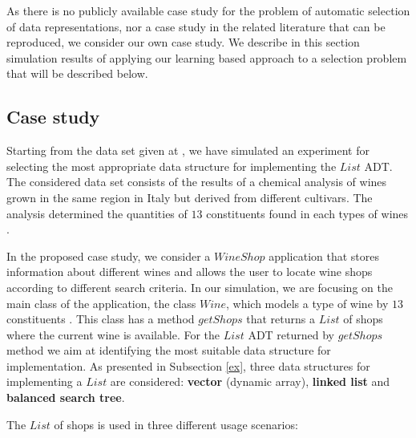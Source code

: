 As there is no publicly available case study for the problem of automatic selection of data representations, nor a case study in the related literature that can be reproduced, we consider our own case study. We describe in this section simulation results of applying
our learning based approach to a selection problem that will be described below.


\subsection{Case study}\label{cs}

Starting from the data set given at \cite{forina}, we have simulated an experiment for selecting the most appropriate data structure for implementing the $List$ ADT. The considered data set consists of the results of a chemical analysis of wines grown in the same region in Italy but derived from  different cultivars. The analysis determined the quantities of $13$ constituents found in each types of wines \cite{website:wine}.

In the proposed case study, we consider a $WineShop$ application that stores information about different wines and allows the user to locate wine shops according to different search criteria. In our simulation, we are focusing on the main class of the application, the class $Wine$, which models a type of wine by $13$ constituents \cite{website:wine}. This class has a method $getShops$ that returns a $List$ of shops where the current wine is available. For the $List$ ADT returned by $getShops$ method we aim at identifying the most suitable data structure for implementation.  As presented in Subsection \ref{ex}, three data structures for implementing a $List$ are considered: \textbf{vector} (dynamic array), \textbf{linked list} and \textbf{balanced search tree}.

The $List$ of shops is used in three different usage scenarios:

